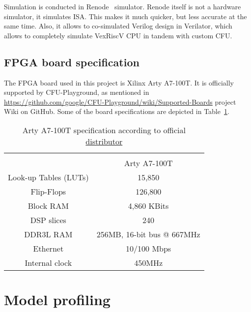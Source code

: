 Simulation is conducted in Renode~\cite{renode} simulator. Renode itself is not a hardware simulator, it simulates ISA. This makes it much quicker, but less accurate at the same time. Also, it allows to co-simulated Verilog design in Verilator, which allows to completely simulate VexRiscV CPU in tandem with custom CFU. 

\subsection{FPGA board specification}
The FPGA board used in this project is Xilinx Arty A7-100T. It is officially supported by CFU-Playground, as mentioned in \url{https://github.com/google/CFU-Playground/wiki/Supported-Boards} project Wiki on GitHub. Some of the board specifications are depicted in Table~\ref{table:arty_specs}.

\begin{table}[h!]
\centering
\begin{tabular}{| c | c |} 
 \hline \\[-1em]
    & Arty A7-100T \\ [1ex]
    \hline
    Look-up Tables (LUTs) & 15,850 \\ [1ex]
    Flip-Flops  &  126,800  \\ [1ex]
    Block RAM & 4,860 KBits \\ [1ex]
    DSP slices & 240 \\ [1ex]
    DDR3L RAM & 256MB, 16-bit bus @ 667MHz \\ [1ex]
    Ethernet & 10/100 Mbps \\ [1ex]
    Internal clock & 450MHz \\ [1ex]
 \hline
\end{tabular}
\caption{Arty A7-100T specification according to official \href{https://digilent.com/reference/programmable-logic/arty-a7/start}{distributor}}
\label{table:arty_specs}
\end{table}


\section{Model profiling}

